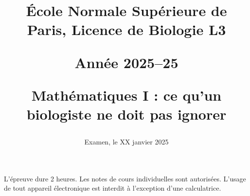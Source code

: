 \documentclass[french, 9pt]{article}
\title{\normalsize{\sc École Normale Supérieure de Paris, Licence de Biologie L3}
  
  \bigskip
  \normalsize{\sc Année 2025–25}
  
  \bigskip
  \large{\bf Mathématiques I : ce qu’un biologiste ne doit pas ignorer} 
  
}
\date{Examen, le XX janvier 2025}
\newcommand{\alglin}{/home/robin/ENSEIGN/Cours/MathBiologie/L3-ENS-Math1/Exercices/AlgLin}
\newcommand{\multivar}{/home/robin/ENSEIGN/Cours/MathBiologie/L3-ENS-Math1/Exercices/MultiVar}
\newcommand{\equadiff}{/home/robin/ENSEIGN/Cours/MathBiologie/L3-ENS-Math1/Exercices/EquaDiff}
\newcommand{\probas}{/home/robin/ENSEIGN/Cours/MathBiologie/L3-ENS-Math1/Exercices/Probas}
\begin{document}

\maketitle

\bigskip
L'épreuve dure 2 heures. 
Les notes de cours individuelles sont autorisées.
L’usage de tout appareil électronique est interdit à l’exception d’une calculatrice.

% 

% 

\bigskip \bigskip 


\bigskip \bigskip 



\end{document}
